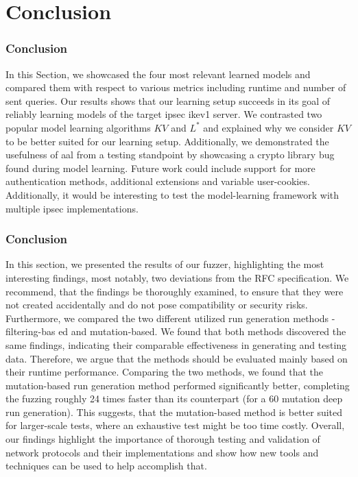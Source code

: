 %
%
% 
% 
% 

\chapter{Conclusion}

\label{chap:Conclusion}

\subsection{Conclusion}
In this Section, we showcased the four most relevant learned models and compared them with respect to various metrics including runtime and number of sent queries. Our results shows that our learning setup succeeds in its goal of reliably learning models of the target \ac{ipsec} \ac{ike}v1 server. We contrasted two popular model learning algorithms $KV$ and $L^*$ and explained why we consider $KV$ to be better suited for our learning setup. Additionally, we demonstrated the usefulness of \ac{aal} from a testing standpoint by showcasing a crypto library bug found during model learning. Future work could include support for more authentication methods, additional extensions and variable user-cookies. Additionally, it would be interesting to test the model-learning framework with multiple \ac{ipsec} implementations.

\subsection{Conclusion}
In this section, we presented the results of our fuzzer, highlighting the most interesting findings, most notably, two deviations from the RFC specification.  We recommend, that the findings be thoroughly examined, to ensure that they were not created accidentally and do not pose compatibility or security risks. Furthermore, we compared the two different utilized run generation methods - filtering-bas ed and mutation-based. We found that both methods discovered the same findings, indicating their comparable effectiveness in generating and testing data. Therefore, we argue that the methods should be evaluated mainly based on their runtime performance. Comparing the two methods, we found that the mutation-based run generation method performed significantly better, completing the fuzzing roughly 24 times faster than its counterpart (for a 60 mutation deep run generation). This suggests, that the mutation-based method is better suited for larger-scale tests, where an exhaustive test might be too time costly. 
Overall, our findings highlight the importance of thorough testing and validation of network protocols and their implementations and show how new tools and techniques can be used to help accomplish that.

